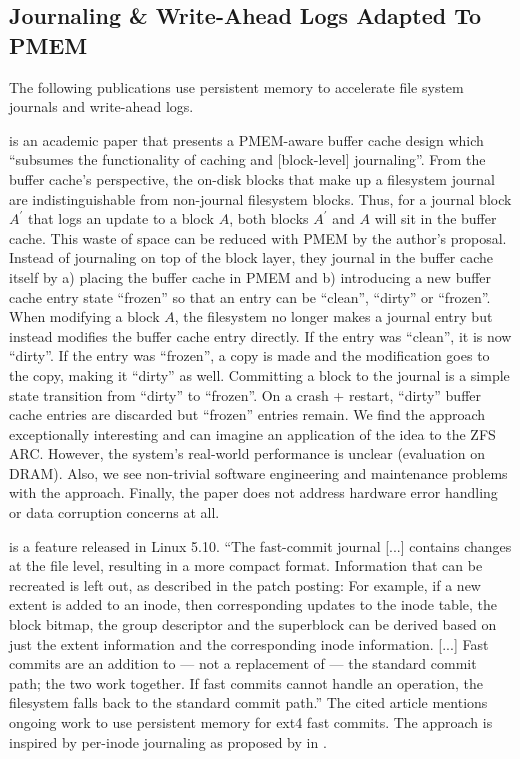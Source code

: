 \documentclass[12pt,a4paper,twoside]{book}
\begin{document}
\subsection{Journaling \& Write-Ahead Logs Adapted To PMEM}\label{sec:relwork:journalingandwals_adapted_to_pmem}
The following publications use persistent memory to accelerate file system journals and write-ahead logs.

 is an academic paper that presents a PMEM-aware buffer cache design which
“subsumes the functionality of caching and [block-level] journaling”.
From the buffer cache’s perspective, the on-disk blocks that make up a filesystem journal are indistinguishable from non-journal filesystem blocks.
Thus, for a journal block $A^\prime$ that logs an update to a block $A$, both blocks $A^\prime$ and $A$ will sit in the buffer cache.
This waste of space can be reduced with PMEM by the author’s proposal.
Instead of journaling on top of the block layer, they journal in the buffer cache itself by a) placing the buffer cache in PMEM and b) introducing a new buffer cache entry state “frozen” so that an entry can be “clean”, “dirty” or “frozen”.
When modifying a block $A$, the filesystem no longer makes a journal entry but instead modifies the buffer cache entry directly.
If the entry was “clean”, it is now “dirty”. If the entry was “frozen”, a copy is made and the modification goes to the copy, making it “dirty” as well.
Committing a block to the journal is a simple state transition from “dirty” to “frozen”. On a crash + restart, “dirty” buffer cache entries are discarded but “frozen” entries remain.
We find the approach exceptionally interesting and can imagine an application of the idea to the ZFS ARC.
However, the system’s real-world performance is unclear (evaluation on DRAM).
Also, we see non-trivial software engineering and maintenance problems with the approach.
Finally, the paper does not address hardware error handling or data corruption concerns at all.

 is a feature released in Linux 5.10.
“The fast-commit journal [...] contains changes at the file level, resulting in a more compact format.
Information that can be recreated is left out, as described in the patch posting:
For example, if a new extent is added to an inode, then corresponding updates to the inode table, the block bitmap, the group descriptor and the superblock can be derived based on just the extent information and the corresponding inode information.
    [...] Fast commits are an addition to — not a replacement of — the standard commit path; the two work together.
If fast commits cannot handle an operation, the filesystem falls back to the standard commit path.”
The cited article mentions ongoing work to use persistent memory for ext4 fast commits.
The approach is inspired by per-inode journaling as proposed by \citeauthor{parkIJournalingFinegrainedJournaling2017} in \cite{parkIJournalingFinegrainedJournaling2017}.
\end{document}
